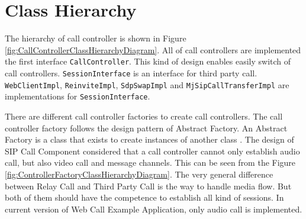 \section{Class Hierarchy}

The hierarchy of call controller is shown in Figure \ref{fig:CallControllerClassHierarchyDiagram}. All of call controllers are implemented the first interface \texttt{CallController}. This kind of design enables easily switch of call controllers. \texttt{SessionInterface} is an interface for third party call. \texttt{WebClientImpl}, \texttt{ReinviteImpl}, \texttt{SdpSwapImpl} and \texttt{MjSipCallTransferImpl} are implementations for \texttt{SessionInterface}. 

There are different call controller factories to create call controllers. The call controller factory follows the design pattern of \textsf{Abstract Factory}. An \textsf{Abstract Factory} is a class that exists to create instances of another class \cite{DesignPatternGoF}. The design of SIP Call Component considered that a call controller cannot only establish audio call, but also video call and message channels. This can be seen from the Figure \ref{fig:ControllerFactoryClassHierarchyDiagram}. The very general difference between Relay Call and Third Party Call is the way to handle media flow. But both of them should have the competence to establish all kind of sessions. In current version of Web Call Example Application, only audio call is implemented.

\begin{sidewaysfigure}
\centering
{}
\caption{Call Controller class hierarchy diagram}
\label{fig:CallControllerClassHierarchyDiagram}
\end{sidewaysfigure}

\begin{sidewaysfigure}
\centering
{}
\caption{Controller Factory class hierarchy diagram}
\label{fig:ControllerFactoryClassHierarchyDiagram}
\end{sidewaysfigure}



